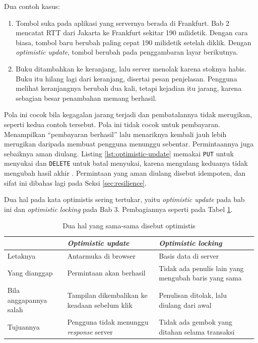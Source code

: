 Dua contoh kasus:

\begin{enumerate}
  \item Tombol suka pada aplikasi yang servernya berada di Frankfurt. Bab 2
        mencatat RTT dari Jakarta ke Frankfurt sekitar 190 milidetik. Dengan
        cara biasa, tombol baru berubah paling cepat 190 milidetik setelah
        diklik. Dengan \textit{optimistic update}, tombol berubah pada
        penggambaran layar berikutnya.
  \item Buku ditambahkan ke keranjang, lalu server menolak karena stoknya
        habis. Buku itu hilang lagi dari keranjang, disertai pesan penjelasan.
        Pengguna melihat keranjangnya berubah dua kali, tetapi kejadian itu
        jarang, karena sebagian besar penambahan memang berhasil.
\end{enumerate}

Pola ini cocok bila kegagalan jarang terjadi dan pembatalannya tidak
merugikan, seperti kedua contoh tersebut. Pola ini tidak cocok untuk
pembayaran. Menampilkan ``pembayaran berhasil'' lalu menariknya kembali jauh
lebih merugikan daripada membuat pengguna menunggu sebentar. Permintaannya juga
sebaiknya aman diulang. Listing \ref{lst:optimistic-update} memakai
\texttt{PUT} untuk menyukai dan \texttt{DELETE} untuk batal menyukai, karena
mengulang keduanya tidak mengubah hasil akhir \cite{rfc9110}. Permintaan yang
aman diulang disebut idempoten, dan sifat ini dibahas lagi pada Seksi
\ref{sec:resilience}.

Dua hal pada kata optimistis sering tertukar, yaitu \textit{optimistic
update} pada bab ini dan \textit{optimistic locking} pada Bab 3. Pembagiannya
seperti pada Tabel \ref{tab:dua-optimistis}.

\begin{table}[!htb]
  \centering
  \caption{Dua hal yang sama-sama disebut optimistis}
  \label{tab:dua-optimistis}
  \begin{tabularx}{\textwidth}{lXX}
    \hline
     & \textbf{\textit{Optimistic update}} & \textbf{\textit{Optimistic locking}} \\
    \hline
    Letaknya & Antarmuka di browser & Basis data di server \\
    \hline
    Yang dianggap & Permintaan akan berhasil & Tidak ada penulis lain yang mengubah baris yang sama \\
    \hline
    Bila anggapannya salah & Tampilan dikembalikan ke keadaan sebelum klik & Penulisan ditolak, lalu diulang dari awal \\
    \hline
    Tujuannya & Pengguna tidak menunggu \textit{response} server & Tidak ada gembok yang ditahan selama transaksi \\
    \hline
  \end{tabularx}
\end{table}

